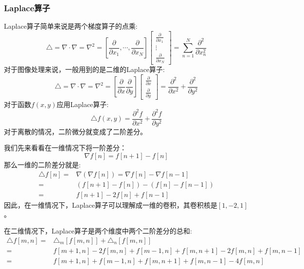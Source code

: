 \subsubsection{Laplace算子}
Laplace算子简单来说是两个梯度算子的点乘:
\begin{equation*}
\triangle=\nabla \cdot \nabla=\nabla^{2}=\left[\frac{\partial}{\partial x_{1}}, \cdots, \frac{\partial}{\partial x_{N}}\right] \left[ \begin{array}{c}{\frac{\partial}{\partial x_{1}}} \\ {\vdots} \\ {\frac{\partial}{\partial x_{N}}}\end{array}\right]=\sum_{n=1}^{N} \frac{\partial^{2}}{\partial x_{n}^{2}}
\end{equation*}
对于图像处理来说，一般用到的是二维的Laplace算子:
\begin{equation*}
\triangle=\nabla \cdot \nabla=\nabla^{2}=\left[\frac{\partial}{\partial x} \frac{\partial}{\partial y}\right] \left[ \begin{array}{c}{\frac{\partial}{\partial x}} \\ {\frac{\partial}{\partial y}}\end{array}\right]=\frac{\partial^{2}}{\partial x^{2}}+\frac{\partial^{2}}{\partial y^{2}}
\end{equation*}
对于函数$f(x,y)$应用Laplace算子:
\begin{equation*}
\triangle f(x, y)=\frac{\partial^{2} f}{\partial x^{2}}+\frac{\partial^{2} f}{\partial y^{2}}
\end{equation*}
对于离散的情况，二阶微分就变成了二阶差分。\par
我们先来看看在一维情况下将一阶差分：
\begin{equation*}
\nabla f[n]=f[n+1]-f[n]
\end{equation*}
那么一维的二阶差分就是:
\begin{equation*}
	\begin{aligned}
	\triangle f[n]=&\nabla(\nabla f[n])=\nabla f[n]-\nabla f[n-1]\\
	=&(f[n+1]-f[n])-(f[n]-f[n-1])\\
	=&f[n+1]-2 f[n]+f[n-1]
	\end{aligned}
\end{equation*}
因此，在一维情况下，Laplace算子可以理解成一维的卷积，其卷积核是$[1,-2,1]$。\par
在二维情况下，Laplace算子是两个维度中两个二阶差分的总和:
\begin{equation}
\begin{aligned}
\triangle f[m, n]=&\triangle_{m}[f[m, n]]+\triangle_{n}[f[m, n]]\\
=&f[m+1, n]-2 f[m, n]+f[m-1, n]+f[m, n+1]-2 f[m, n]+f[m, n-1]\\
=&f[m+1, n]+f[m-1, n]+f[m, n+1]+f[m, n-1]-4 f[m, n]
\end{aligned}
\end{equation}
